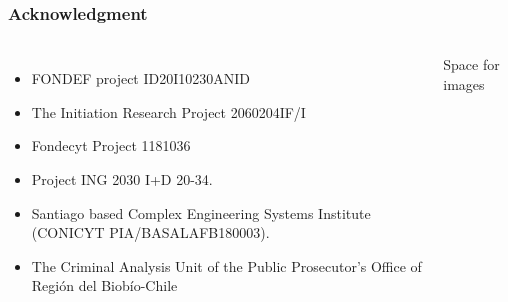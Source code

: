 \documentclass[aspectratio=169]{beamer}
\begin{document}
\begin{frame}
\frametitle{Acknowledgment}
\begin{columns}
\begin{itemize}
\item FONDEF project ID20I10230ANID
\item The Initiation Research Project 2060204IF/I
\item Fondecyt Project 1181036
\item Project ING 2030 I+D 20-34.
\item Santiago based Complex Engineering Systems Institute (CONICYT PIA/BASALAFB180003).
\item The Criminal Analysis Unit of the Public Prosecutor's Office of Región del Biobío-Chile
\end{itemize}
Space for images
\end{columns}
\end{frame}

\begin{frame}
  \titlepage
\end{frame}
\end{document}
